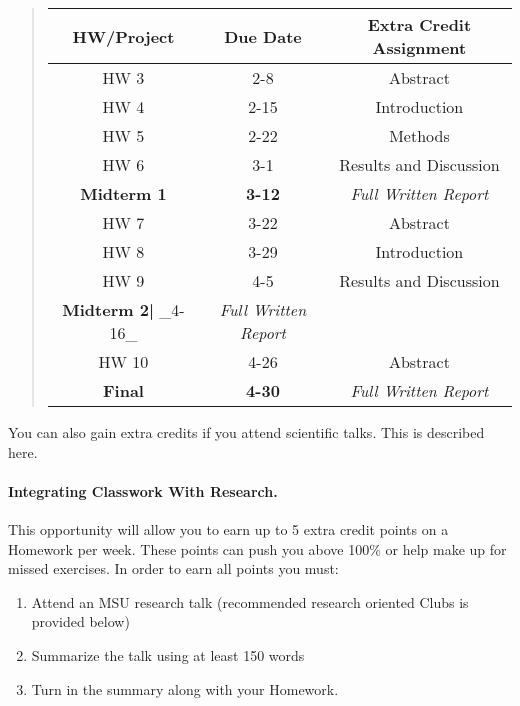 \documentclass[%
oneside,                 %
final,                   %
10pt]{article}
\begin{document}
\begin{quote}
\begin{tabular}{ccc}
\hline
\multicolumn{1}{c}{ HW/Project } & \multicolumn{1}{c}{ Due Date } & \multicolumn{1}{c}{ Extra Credit Assignment } \\
\hline
HW 3                       & 2-8                        & Abstract                   \\
HW 4                       & 2-15                       & Introduction               \\
HW 5                       & 2-22                       & Methods                    \\
HW 6                       & 3-1                        & Results and Discussion     \\
\textbf{Midterm 1}         & \textbf{3-12}              & \emph{Full Written Report} \\
HW 7                       & 3-22                       & Abstract                   \\
HW 8                       & 3-29                       & Introduction               \\
HW 9                       & 4-5                        & Results and Discussion     \\
\textbf{Midterm 2|} _4-16_ & \emph{Full Written Report} \\
HW 10                      & 4-26                       & Abstract                   \\
\textbf{Final}             & \textbf{4-30}              & \emph{Full Written Report} \\
\hline
\end{tabular}
\end{quote}

\noindent
You can also gain extra credits if you attend scientific talks.
This is described here.

\paragraph{Integrating Classwork With Research.}
This opportunity will allow you to earn up to 5 extra credit points on a Homework per week. These points can push you above 100\% or help make up for missed exercises.
In order to earn all points you must:

\begin{enumerate}
\item Attend an MSU research talk (recommended research oriented Clubs is  provided below)

\item Summarize the talk using at least 150 words

\item Turn in the summary along with your Homework.
\end{enumerate}
\end{document}
